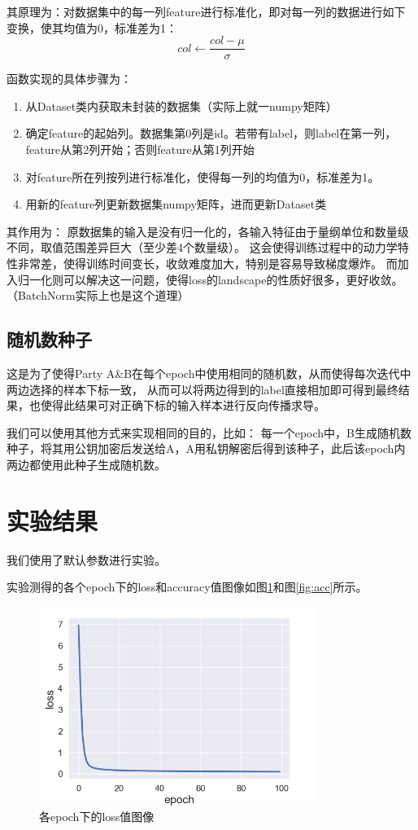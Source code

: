 \documentclass[twoside,11pt]{article}
\begin{document}
其原理为：对数据集中的每一列feature进行标准化，即对每一列的数据进行如下变换，使其均值为0，标准差为1：
$$
    col \leftarrow \frac{col-\mu}{\sigma}
$$

函数实现的具体步骤为：
\begin{enumerate}
    \item 从Dataset类内获取未封装的数据集（实际上就一numpy矩阵）
    \item 确定feature的起始列。数据集第0列是id。若带有label，则label在第一列，feature从第2列开始；否则feature从第1列开始
    \item 对feature所在列按列进行标准化，使得每一列的均值为0，标准差为1。
    \item 用新的feature列更新数据集numpy矩阵，进而更新Dataset类
\end{enumerate}

其作用为：
原数据集的输入是没有归一化的，各输入特征由于量纲单位和数量级不同，取值范围差异巨大（至少差4个数量级）。
这会使得训练过程中的动力学特性非常差，使得训练时间变长，收敛难度加大，特别是容易导致梯度爆炸。
而加入归一化则可以解决这一问题，使得loss的landscape的性质好很多，更好收敛。（BatchNorm实际上也是这个道理）


\subsection{随机数种子}

这是为了使得Party A\&B在每个epoch中使用相同的随机数，从而使得每次迭代中两边选择的样本下标一致，
从而可以将两边得到的label直接相加即可得到最终结果，也使得此结果可对正确下标的输入样本进行反向传播求导。

我们可以使用其他方式来实现相同的目的，比如：
每一个epoch中，B生成随机数种子，将其用公钥加密后发送给A，A用私钥解密后得到该种子，此后该epoch内两边都使用此种子生成随机数。

\section{实验结果}
我们使用了默认参数进行实验。

实验测得的各个epoch下的loss和accuracy值图像如图\ref{fig:loss}和图\ref{fig:acc}所示。

\begin{figure}[htbp]
    \centering
    \includegraphics[width=0.8\textwidth]{pic/loss-plot.png}
    \caption{各epoch下的loss值图像}
    \label{fig:loss}
\end{figure}
\end{document}
